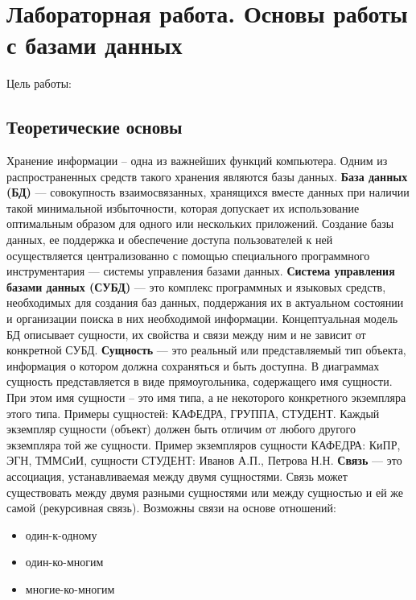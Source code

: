 \documentclass[a4paper]{article}
\begin{document}
\section{Лабораторная работа. Основы работы с базами данных}

Цель работы:

\subsection{Теоретические основы}

Хранение информации – одна из важнейших функций компьютера. Одним из распространенных средств такого хранения являются базы данных.\linebreak
\textbf{База данных (БД)} --- совокупность взаимосвязанных, хранящихся вместе данных при наличии такой минимальной избыточности, которая допускает их использование оптимальным образом для одного или нескольких приложений. Создание базы данных, ее поддержка и обеспечение доступа пользователей к ней осуществляется централизованно с помощью специального программного инструментария --- системы управления базами данных.\linebreak
\textbf{Система управления базами данных (СУБД)} --- это комплекс программных и языковых средств, необходимых для создания баз данных, поддержания их в актуальном состоянии и организации поиска в них необходимой информации. Концептуальная модель БД описывает сущности, их свойства и связи между ним и не зависит от конкретной СУБД.\linebreak
\textbf{Сущность} --- это реальный или представляемый тип объекта, информация о котором должна сохраняться и быть доступна. В диаграммах сущность представляется в виде прямоугольника, содержащего имя сущности. При этом имя сущности – это имя типа, а не некоторого конкретного экземпляра этого типа. Примеры сущностей: КАФЕДРА, ГРУППА, СТУДЕНТ. Каждый экземпляр сущности (объект) должен быть отличим от любого другого экземпляра той же сущности. Пример экземпляров сущности КАФЕДРА: КиПР, ЭГН, ТММСиИ, сущности СТУДЕНТ: Иванов А.П., Петрова Н.Н. \linebreak
\textbf{Связь} --- это ассоциация, устанавливаемая между двумя сущностями. Связь может существовать между двумя разными сущностями или между сущностью и ей же самой (рекурсивная связь). Возможны связи на основе отношений:
\begin{itemize}
    \item один-к-одному
    \item один-ко-многим
    \item многие-ко-многим
\end{itemize}
\end{document}
